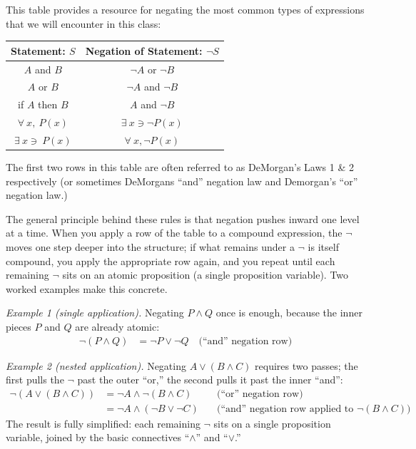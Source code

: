 This table provides a resource for negating the most common types of expressions that we will encounter in this class:
\begin{center}
  \begin{tabular}{|c|c|}\hline
     \textbf{Statement: $S$} & \textbf{Negation of Statement: $\lnot S$}   \\ \hline
     $A$ and $B$ & $\lnot A$ or $\lnot B$  \\ \hline
     $A$ or $B$ & $\lnot A$ and $\lnot B$  \\ \hline 
     if $A$ then $B$ & $A$ and $\lnot B$  \\ \hline
     $\forall \ x, \ P(x)$ & $\exists \ x \ni \lnot P(x)$  \\ \hline
     $\exists \ x \ni \ P(x)$ & $\forall \ x, \lnot P(x)$  \\ \hline
\end{tabular}  
\end{center}
The first two rows in this table are often referred to as DeMorgan's Laws 1 \& 2 respectively (or sometimes DeMorgans ``and'' negation law and Demorgan's ``or'' negation law.) \steezybreak

\noindent The general principle behind these rules is that negation pushes inward one level at a time. When you apply a row of the table to a compound expression, the $\lnot$ moves one step deeper into the structure; if what remains under a $\lnot$ is itself compound, you apply the appropriate row again, and you repeat until each remaining $\lnot$ sits on an atomic proposition (a single proposition variable). Two worked examples make this concrete.

\noindent \textit{Example 1 (single application).} Negating $P \land Q$ once is enough, because the inner pieces $P$ and $Q$ are already atomic:
\begin{align}
    \lnot(P \land Q) &= \lnot P \lor \lnot Q \quad \text{(``and'' negation row)} \nonumber
\end{align}

\noindent \textit{Example 2 (nested application).} Negating $A \lor (B \land C)$ requires two passes; the first pulls the $\lnot$ past the outer ``or,'' the second pulls it past the inner ``and'':
\begin{align}
    \lnot(A \lor (B \land C)) &= \lnot A \land \lnot(B \land C) \quad &\text{(``or'' negation row)} \nonumber \\
    &= \lnot A \land (\lnot B \lor \lnot C) \quad &\text{(``and'' negation row applied to } \lnot(B \land C) \text{)} \nonumber
\end{align}
The result is fully simplified: each remaining $\lnot$ sits on a single proposition variable, joined by the basic connectives ``$\land$'' and ``$\lor$.''

